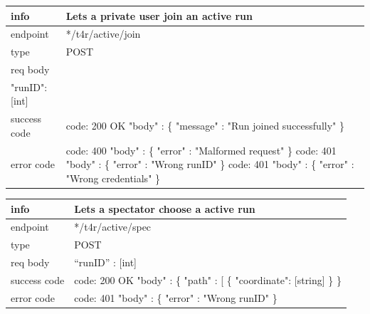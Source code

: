 \documentclass[titlepage]{article}
\begin{document}
	\vspace{\baselineskip}
	
	\begin{tabularx}{\textwidth}{lX} \hline
		info & Lets a private user join an active run \\ \hline
		endpoint & */t4r/active/join \\ \hline
		type & POST \\ \hline
		req body & \\ \newline
		"runID": [int] \\ \hline
		success code &
		code: 200 OK \newline  
		"body" : \{ \newline
		"message" : "Run joined successfully" \newline
		\} \\ \hline
		error code &
		code: 400 \newline
		"body" : \{ "error" : "Malformed request" \} \newline \newline
		code: 401 \newline
		"body" : \{ "error" : "Wrong runID" \} \newline \newline
		code: 401 \newline
		"body" : \{ "error" : "Wrong credentials" \} \\ \hline
	\end{tabularx}
	
	\vspace{\baselineskip}
	
	\begin{tabularx}{\textwidth}{lX} \hline
		info & Lets a spectator choose a active run \\ \hline
		endpoint & */t4r/active/spec \\ \hline
		type & POST \\ \hline
		req body & “runID” : [int] \\ \hline
		success code &
		code: 200 OK \newline  
		"body" : \{ \newline
		"path" : [ \newline
		\{ \newline
		"coordinate": [string] \newline
		\} \newline
		\} \\ \hline
		error code &
		code: 401 \newline
		"body" : \{ "error" : "Wrong runID" \} \\ \hline 
	\end{tabularx}
	
\end{document}
